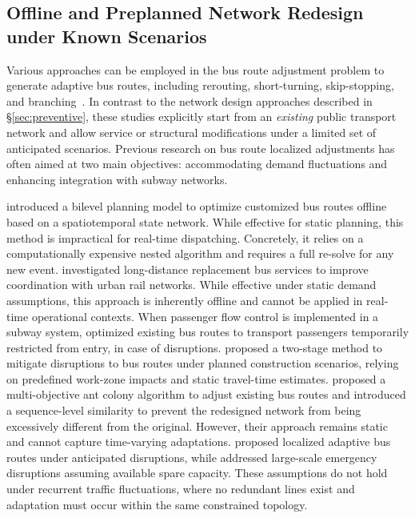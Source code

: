 \documentclass[a4paper,fleqn]{cas-sc}
\begin{document}
\subsection{Offline and Preplanned Network Redesign under Known Scenarios}
\label{sec:offline}

Various approaches can be employed in the bus route adjustment problem to generate adaptive bus routes, including rerouting, short-turning, skip-stopping, and branching~\citep{cao2019autonomous, ma2023integrated, wu2021modular}. 
In contrast to the network design approaches described in \S{}\ref{sec:preventive}, these studies explicitly start from an \emph{existing} public transport network and allow service or structural modifications under a limited set of anticipated scenarios.
Previous research on bus route localized adjustments has often aimed at two main objectives: accommodating demand fluctuations and enhancing integration with subway networks.

\citet{guan2023bi} introduced a bilevel planning model to optimize customized bus routes offline based on a spatiotemporal state network. While effective for static planning, this method is impractical for real-time dispatching. Concretely, it relies on a computationally expensive nested algorithm and requires a full re-solve for any new event.
%
\citet{zhang2018optimal} investigated long-distance replacement bus services to improve coordination with urban rail networks. While effective under static demand assumptions, this approach is inherently offline and cannot be applied in real-time operational contexts.
%
When passenger flow control is implemented in a subway system, \citet{zhou2021integrated} optimized existing bus routes to transport passengers temporarily restricted from entry, in case of disruptions.
%
\citet{wang2022optimization} proposed a two-stage method to mitigate disruptions to bus routes under planned construction scenarios, relying on predefined work-zone impacts and static travel-time estimates.
%
\citet{wu2024multi} proposed a multi-objective ant colony algorithm to adjust existing bus routes and introduced a sequence-level similarity to prevent the redesigned network from being excessively different from the original. However, their approach remains static and cannot capture time-varying adaptations.
%
\citet{zheng2024alternative} proposed localized adaptive bus routes under anticipated disruptions, while \citet{zhang2024improving} addressed large-scale emergency disruptions assuming available spare capacity.
These assumptions do not hold under recurrent traffic fluctuations, where no redundant lines exist and adaptation must occur within the same constrained topology.
\end{document}
